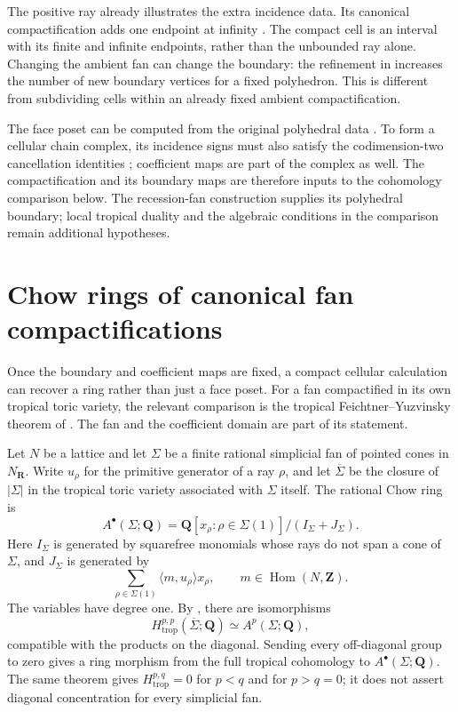 The positive ray already illustrates the extra incidence data. Its
canonical compactification adds one endpoint at infinity
\cite[Example~6.1]{KSW25Compactification}. The compact cell is an
interval with its finite and infinite endpoints, rather than the
unbounded ray alone. Changing the ambient fan can change the boundary:
the refinement in \cite[Example~3.27]{KSW25Compactification} increases
the number of new boundary vertices for a fixed polyhedron. This is
different from subdividing cells within an already fixed ambient
compactification.

The face poset can be computed from the original polyhedral data
\cite[Theorem~4.8]{KSW25Compactification}. To form a cellular chain
complex, its incidence signs must also satisfy the codimension-two
cancellation identities \cite[Definitions~5.1 and~5.2, Proposition~5.4]
{KSW25Compactification}; coefficient maps are part of the complex as
well. The compactification and its boundary maps are therefore inputs
to the cohomology comparison below. The recession-fan construction
supplies its polyhedral boundary; local tropical duality and the
algebraic conditions in the comparison remain additional hypotheses.

\section{Chow rings of canonical fan compactifications}
\label{sec:appG-canonical-fan-chow}

Once the boundary and coefficient maps are fixed, a compact cellular
calculation can recover a ring rather than just a face poset. For a fan
compactified in its own tropical toric variety, the relevant comparison
is the tropical Feichtner--Yuzvinsky theorem of
\cite{AP24FanChow}. The fan and the coefficient domain are part of its
statement.

Let $N$ be a lattice and let $\Sigma$ be a finite rational simplicial fan
of pointed cones in $N_{\mathbf R}$. Write $u_\rho$ for the primitive
generator of a ray $\rho$, and let $\overline\Sigma$ be the closure of
$|\Sigma|$ in the tropical toric variety associated with $\Sigma$ itself.
The rational Chow ring is
\[
 A^\bullet(\Sigma;\mathbf Q)
   =\mathbf Q[x_\rho:\rho\in\Sigma(1)]/(I_\Sigma+J_\Sigma).
\]
Here $I_\Sigma$ is generated by squarefree monomials whose rays do not
span a cone of $\Sigma$, and $J_\Sigma$ is generated by
\[
 \sum_{\rho\in\Sigma(1)}\langle m,u_\rho\rangle x_\rho,
 \qquad m\in\operatorname{Hom}(N,\mathbf Z).
\]
The variables have degree one. By
\cite[Theorem~1.1]{AP24FanChow}, there are isomorphisms
\[
 H^{p,p}_{\mathrm{trop}}(\overline\Sigma;\mathbf Q)
     \simeq A^p(\Sigma;\mathbf Q),
\]
compatible with the products on the diagonal. Sending every
off-diagonal group to zero gives a ring morphism from the full tropical
cohomology to $A^\bullet(\Sigma;\mathbf Q)$. The same theorem gives
$H^{p,q}_{\mathrm{trop}}=0$ for $p<q$ and for $p>q=0$; it does not
assert diagonal concentration for every simplicial fan.

